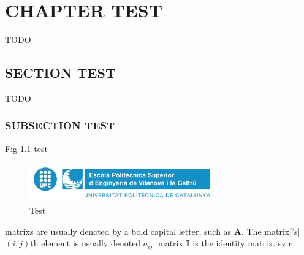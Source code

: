 \newpage
\pagestyle{plain}

\chapter{CHAPTER TEST}

TODO
\section{SECTION TEST}

TODO

\subsection{SUBSECTION TEST}

Fig \ref{fig:test} test

\begin{figure}[h]
    \includegraphics[width=8cm]{media/epsevg_logo}
    \centering
    \caption{Test}
    \label{fig:test}
\end{figure}

\Glspl{matrix} are usually denoted by a bold capital letter, such as $\mathbf{A}$. The \gls{matrix}['s] $(i,j)$th element is usually denoted $a_{ij}$. \Gls{matrix} $\mathbf{I}$ is the identity \gls{matrix}. 
\gls{svm}

